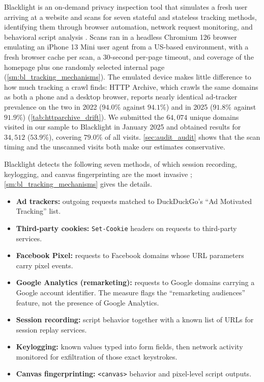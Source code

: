 \documentclass[12pt, letterpaper]{article}
\begin{document}
Blacklight is an on-demand privacy inspection tool that simulates a fresh user arriving at a website and scans for seven stateful and stateless tracking methods, identifying them through browser automation, network request monitoring, and behavioral script analysis \citep{blacklight}.
Scans ran in a headless Chromium 126 browser emulating an iPhone 13 Mini user agent from a US-based environment, with a fresh browser cache per scan, a 30-second per-page timeout, and coverage of the homepage plus one randomly selected internal page (\cref{sm:bl_tracking_mechanisms}).
The emulated device makes little difference to how much tracking a crawl finds: HTTP Archive, which crawls the same domains as both a phone and a desktop browser, reports nearly identical ad-tracker prevalence on the two in 2022 ($94.0\%$ against $94.1\%$) and in 2025 ($91.8\%$ against $91.9\%$) (\cref{tab:httparchive_drift}). We submitted the $64{,}074$ unique domains visited in our sample to Blacklight in January 2025 and obtained results for $34{,}512$ ($53.9\%$), covering $79.0\%$ of all visits. \cref{sec:audit_audit} shows that the scan timing and the unscanned visits both make our estimates conservative.

Blacklight detects the following seven methods, of which session recording, keylogging, and canvas fingerprinting are the most invasive \citep{Acar2014, karaj2018whotracks, blacklight, MS12, leakyforms, berke2025whose}; \cref{sm:bl_tracking_mechanisms} gives the details.
 
\onehalfspacing
\begin{itemize}\itemsep2pt
    \item \textbf{Ad trackers:} outgoing requests matched to DuckDuckGo's ``Ad Motivated Tracking'' list.
    \item \textbf{Third-party cookies:} \texttt{Set-Cookie} headers on requests to third-party services.
    \item \textbf{Facebook Pixel:} requests to Facebook domains whose URL parameters carry pixel events.
    \item \textbf{Google Analytics (remarketing):} requests to Google domains carrying a Google account identifier. The measure flags the ``remarketing audiences'' feature, not the presence of Google Analytics.
    \item \textbf{Session recording:} script behavior together with a known list of URLs for session replay services.
    \item \textbf{Keylogging:} known values typed into form fields, then network activity monitored for exfiltration of those exact keystrokes.
    \item \textbf{Canvas fingerprinting:} \texttt{<canvas>} behavior and pixel-level script outputs.
\end{itemize}
\doublespacing
\end{document}
